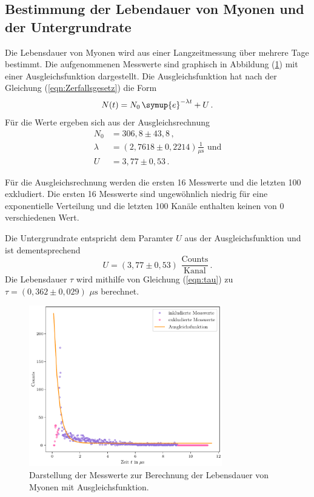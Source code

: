 \subsection{Bestimmung der Lebendauer von Myonen und der Untergrundrate}
Die Lebensdauer von Myonen wird aus einer Langzeitmessung über
mehrere Tage bestimmt. 
Die aufgenommenen Messwerte sind graphisch in Abbildung (\ref{fig:Lebensdauer_Myonen})
mit einer Ausgleichsfunktion dargestellt. Die Ausgleichsfunktion 
hat nach der Gleichung (\ref{eqn:Zerfallsgesetz}) die Form 
$$ N(t) = N_0 \,\symup{e}^{-\lambda t} + U \,.$$
Für die Werte ergeben sich aus der Ausgleichsrechnung 
\begin{align*}
  N_0 &= 306,8 \pm 43,8 \, ,\\
  \lambda &= (2,7618 \pm 0,2214) \frac{1}{\unit{\mu\second}} \,\, \text{und}\\
  U &= 3,77 \pm 0,53 \, .
\end{align*}

Für die Ausgleichsrechnung werden 
die ersten 16 Messwerte und die letzten 100 exkludiert. Die ersten 16
Messwerte sind ungewöhnlich niedrig für eine exponentielle Verteilung 
und die letzten 100 Kanäle enthalten keinen von 0 verschiedenen Wert. 

Die Untergrundrate entspricht dem Paramter $U$ aus der Ausgleichsfunktion 
und ist dementsprechend $$U = (3,77 \pm 0,53) \,\, \frac{\text{Counts}}{\text{Kanal}}\,.$$
Die Lebensdauer $\tau$ wird mithilfe von Gleichung (\ref{eqn:tau}) zu 
$\tau = (0,362 \pm 0,029) \,\, \unit{\mu\second} $ berechnet.

\begin{figure}
  \centering
  \includegraphics[width=0.75\textwidth]{Lebensdauer_der_Myonen.pdf}
  \caption{Darstellung der Messwerte zur Berechnung der Lebensdauer von Myonen mit Ausgleichsfunktion.}
  \label{fig:Lebensdauer_Myonen}
\end{figure}

